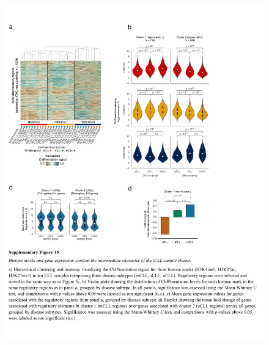 \documentclass[10pt,]{article}
\begin{document}
\begin{figure}
\centering
\includegraphics[width=1.000\hsize]{figures/Supplementary_Information_15.pdf}
\end{figure}
\clearpage
\end{document}
